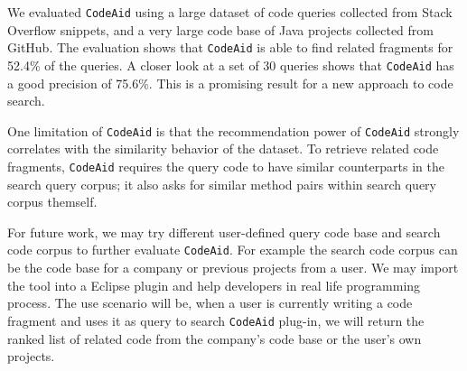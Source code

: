 \documentclass[conference]{IEEEtran}
\newcommand{\ttt}[1]{\tt\small{#1}}
\newcommand{\tool}{{\ttt CodeAid}}
\begin{document}
We evaluated {\tool} using a large dataset of code queries collected
from Stack Overflow snippets, and a very large code base of Java
projects collected from GitHub. The evaluation shows that {\tool} is
able to find related fragments for 52.4\% of the queries. A closer look at a set of 30
queries shows that {\tool} has a good precision of 75.6\%. This is
a promising result for a new approach to code search. 

One limitation of {\tool} is that the recommendation power of {\tool} strongly correlates with the similarity behavior of the dataset. To retrieve related code fragments, {\tool} requires the query code to have similar counterparts in the search query corpus; it also asks for similar method pairs within search query corpus themself. 

For future work, we may try different user-defined query code base and search code corpus to further evaluate {\tool}. For example the search code corpus can be the code base for a company or previous projects from a user. We may import the tool into a Eclipse plugin and help developers in real life programming process. The use scenario will be, when a user is currently writing a code fragment and uses it as query to search {\tool} plug-in, we will return the ranked list of related code from the company's code base or the user's own projects.





\end{document}
